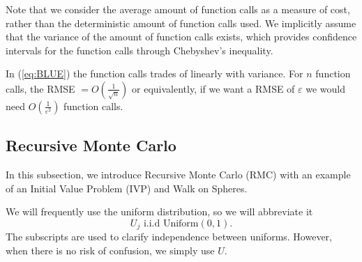 \documentclass[a4paper,12pt]{article}
\begin{document}
Note that we consider the average amount of function calls as a measure of cost,
rather than the deterministic amount of function calls used. We implicitly assume that the variance of the amount
of function calls exists, which provides confidence intervals for the function calls through Chebyshev's inequality.


\begin{example}
  In (\ref{eq:BLUE}) the function calls trades of
  linearly with variance. For $n$ function calls,
  the RMSE $= O\left(\frac{1}{\sqrt{n}}\right)$ or equivalently, if we want a
  RMSE of $\varepsilon$ we would need $O\left(\frac{1}{\varepsilon^{2}}\right)$
  function calls.
\end{example}


\subsection{Recursive Monte Carlo}
In this subsection, we introduce Recursive Monte Carlo (RMC)
with an example of an Initial Value Problem (IVP) and
Walk on Spheres.

\begin{notation}[$U,U_{j}$]
  We will frequently use the uniform distribution, so we will abbreviate it
  \begin{equation}
    U_{j}  \text{ i.i.d Uniform}(0,1).
  \end{equation}
  The subscripts are used to clarify independence
  between uniforms. However,
  when there is no risk of confusion,
  we simply use $U.$
\end{notation}
\end{document}
